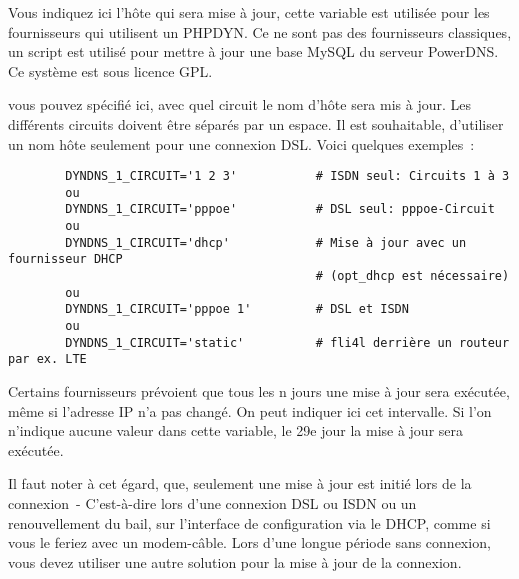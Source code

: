 \begin{description}

    {Vous indiquez ici l'hôte qui sera mise à jour, cette variable est utilisée
    pour les fournisseurs qui utilisent un PHPDYN. Ce ne sont pas des fournisseurs
    classiques, un script est utilisé pour mettre à jour une base MySQL du
    serveur PowerDNS. Ce système est sous licence GPL.
  }


    {vous pouvez spécifié ici, avec quel circuit le nom d'hôte sera mis à jour.
    Les différents circuits doivent être séparés par un espace. Il est souhaitable,
    d'utiliser un nom hôte seulement pour une connexion DSL. Voici quelques exemples~:

\begin{example}
\begin{verbatim}
        DYNDNS_1_CIRCUIT='1 2 3'           # ISDN seul: Circuits 1 à 3
        ou
        DYNDNS_1_CIRCUIT='pppoe'           # DSL seul: pppoe-Circuit
        ou
        DYNDNS_1_CIRCUIT='dhcp'            # Mise à jour avec un fournisseur DHCP
                                           # (opt_dhcp est nécessaire)
        ou
        DYNDNS_1_CIRCUIT='pppoe 1'         # DSL et ISDN
        ou
        DYNDNS_1_CIRCUIT='static'          # fli4l derrière un routeur par ex. LTE 
\end{verbatim}
\end{example}
  }


    Certains fournisseurs prévoient que tous les n jours une mise à jour
    sera exécutée, même si l'adresse IP n'a pas changé. On peut indiquer ici
    cet intervalle. Si l'on n'indique aucune valeur dans cette variable,
    le 29e jour la mise à jour sera exécutée.

    Il faut noter à cet égard, que, seulement une mise à jour est initié lors de
    la connexion~- C'est-à-dire lors d'une connexion DSL ou ISDN ou un renouvellement
    du bail, sur l’interface de configuration via le DHCP, comme si vous le feriez
    avec un modem-câble. Lors d’une longue période sans connexion, vous devez utiliser
    une autre solution pour la mise à jour de la connexion.



\end{description}
